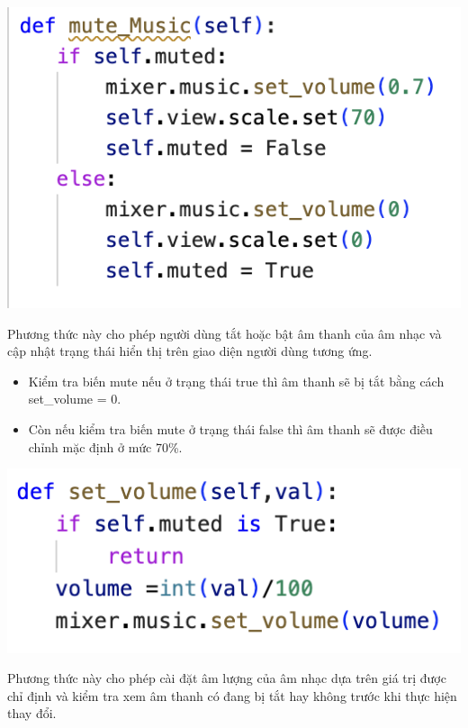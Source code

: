 \documentclass[a4paper]{article}
\begin{document}
\begin{center}
\includegraphics[width=175mm]{template_SGU 2/audio_mute.png}
\end{center}

\hspace*{0.5} Phương thức này cho phép người dùng tắt hoặc bật âm thanh của âm nhạc và cập nhật trạng thái hiển thị trên giao diện người dùng tương ứng.

\begin{itemize}
    \item Kiểm tra biến mute nếu ở trạng thái true thì âm thanh sẽ bị tắt bằng cách set\_volume = 0.
    \item Còn nếu kiểm tra biến mute ở trạng thái false thì âm thanh sẽ được điều chỉnh mặc định ở mức 70\%.
\end{itemize}

\begin{center}
\includegraphics[width=175mm]{template_SGU 2/audio_volume.png}
\end{center}

\hspace*{0.5} Phương thức này cho phép cài đặt âm lượng của âm nhạc dựa trên giá trị được chỉ định và kiểm tra xem âm thanh có đang bị tắt hay không trước khi thực hiện thay đổi.
\end{document}
